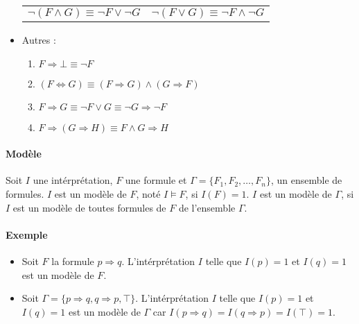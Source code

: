 \documentclass[11pt,twoside,openright,a4paper]{report}
\begin{document}
\begin{itemize}
	\begin{center}

		\begin{tabular}{lr}
			$\neg (F \land G) \equiv \neg F \lor \neg G$ & $\neg (F \lor G) \equiv \neg F \land \neg G$\\
		\end{tabular}
	
	\end{center}

	\item Autres :\\

	\begin{enumerate}
		\item $F \Rightarrow \bot \equiv \neg F$
		\item $(F \Leftrightarrow G) \equiv (F \Rightarrow G) \land (G \Rightarrow F)$
		\item $F \Rightarrow G \equiv \neg F \lor G \equiv \neg G \Rightarrow \neg F$
		\item $F \Rightarrow (G \Rightarrow H) \equiv F \land G \Rightarrow H$
	\end{enumerate}

\end{itemize}


\paragraph{Modèle} %
\label{par:mod_le}

Soit $I$ une intérprétation, $F$ une formule et $\Gamma = \{F_1, F_2, \ldots, F_n\}$, un ensemble de formules. $I$ est un modèle de $F$, noté $I \vDash F$, si $I(F) = 1$. $I$ est un modèle de $\Gamma$, si $I$ est un modèle de toutes formules de $F$ de l'ensemble $\Gamma$.


\paragraph{Exemple} %
\label{par:exemple}

\begin{itemize}
	\item Soit $F$ la formule $p \Rightarrow q$. L'intérprétation $I$ telle que $I(p) = 1$ et $I(q) = 1$ est un modèle de $F$.
	\item Soit $\Gamma = \{p \Rightarrow q, q \Rightarrow p, \top\}$. L'intérprétation $I$ telle que $I(p) = 1$ et $I(q) = 1$ est un modèle de $\Gamma$ car $I(p \Rightarrow q) = I(q \Rightarrow p) = I(\top) = 1$.
\end{itemize}
\end{document}
